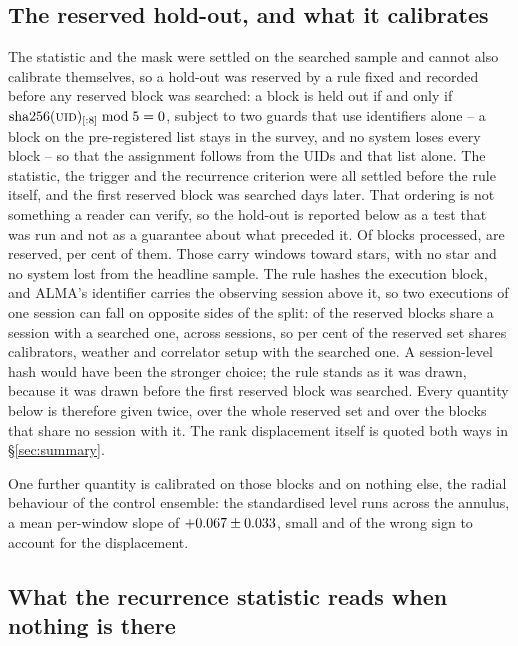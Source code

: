 \subsection{The reserved hold-out, and what it calibrates}
\label{sec:heldout}

The statistic and the mask were settled on the searched sample and cannot also
calibrate themselves, so a hold-out was reserved by a rule fixed and recorded
before any reserved block was searched: a block is held out if and only if
$\mathrm{sha256}(\textsc{uid})_{[:8]} \bmod 5 = 0$, subject to two guards that
use identifiers alone -- a block on the pre-registered list stays in the
survey, and no system loses every block -- so that the assignment follows
from the UIDs and that list alone. The statistic, the trigger and the
recurrence criterion were all settled before the rule itself, and the first
reserved block was searched \HoLeadBlockDays{} days later. That ordering is
not something a reader can verify, so the hold-out is reported below as a
test that was run and not as a guarantee about what preceded it. Of
\NEbProcessedAll{} blocks processed, \NEbHeldOut{} are reserved, \HoPctHeld{}
per cent of them. Those carry \HoWin{} windows toward \HoStars{} stars, with
no star and no system lost from the headline sample. The rule hashes the
execution block, and ALMA's
identifier carries the observing session above it, so two executions of one session can fall on opposite sides of the split:
\BkSessHoBlocks{} of the
\NEbHeldOut{} reserved blocks share a session with a searched one, across
\BkSessShared{} sessions, so \HsSharePct{} per cent of the reserved set shares
calibrators, weather and correlator setup with the searched one. A
session-level hash would have been the stronger choice; the rule stands as it
was drawn, because it was drawn before the first reserved block was searched.
Every quantity below is therefore given twice, over the whole reserved set and
over the \HsIndBlocks{} blocks that share no session with it. The rank
displacement itself is quoted both ways in \S\ref{sec:summary}.

One further quantity is calibrated on those blocks and on nothing else, the
radial behaviour of the control ensemble: the standardised level
runs \HoRadBins{} across the annulus, a mean per-window slope of
$+0.067\pm0.033$, small and of the wrong sign to account for the
displacement.

\subsection{What the recurrence statistic reads when nothing is there}
\label{sec:nullscatter}

